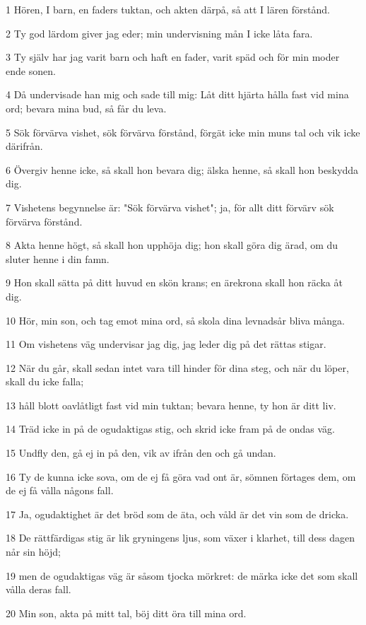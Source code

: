 \par 1 Hören, I barn, en faders tuktan, och akten därpå, så att I lären förstånd.
\par 2 Ty god lärdom giver jag eder; min undervisning mån I icke låta fara.
\par 3 Ty själv har jag varit barn och haft en fader, varit späd och för min moder ende sonen.
\par 4 Då undervisade han mig och sade till mig: Låt ditt hjärta hålla fast vid mina ord; bevara mina bud, så får du leva.
\par 5 Sök förvärva vishet, sök förvärva förstånd, förgät icke min muns tal och vik icke därifrån.
\par 6 Övergiv henne icke, så skall hon bevara dig; älska henne, så skall hon beskydda dig.
\par 7 Vishetens begynnelse är: "Sök förvärva vishet"; ja, för allt ditt förvärv sök förvärva förstånd.
\par 8 Akta henne högt, så skall hon upphöja dig; hon skall göra dig ärad, om du sluter henne i din famn.
\par 9 Hon skall sätta på ditt huvud en skön krans; en ärekrona skall hon räcka åt dig.
\par 10 Hör, min son, och tag emot mina ord, så skola dina levnadsår bliva många.
\par 11 Om vishetens väg undervisar jag dig, jag leder dig på det rättas stigar.
\par 12 När du går, skall sedan intet vara till hinder för dina steg, och när du löper, skall du icke falla;
\par 13 håll blott oavlåtligt fast vid min tuktan; bevara henne, ty hon är ditt liv.
\par 14 Träd icke in på de ogudaktigas stig, och skrid icke fram på de ondas väg.
\par 15 Undfly den, gå ej in på den, vik av ifrån den och gå undan.
\par 16 Ty de kunna icke sova, om de ej få göra vad ont är, sömnen förtages dem, om de ej få vålla någons fall.
\par 17 Ja, ogudaktighet är det bröd som de äta, och våld är det vin som de dricka.
\par 18 De rättfärdigas stig är lik gryningens ljus, som växer i klarhet, till dess dagen når sin höjd;
\par 19 men de ogudaktigas väg är såsom tjocka mörkret: de märka icke det som skall vålla deras fall.
\par 20 Min son, akta på mitt tal, böj ditt öra till mina ord.
